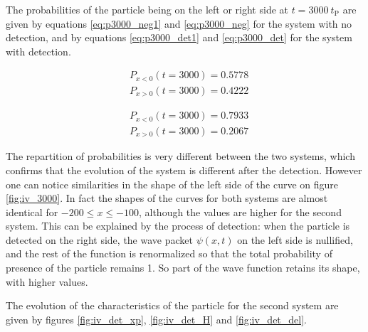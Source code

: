 \documentclass[a4paper,12pt,twoside]{article}
\begin{document}
The probabilities of the particle being on the left or right side at $t=3000~t_\text{P}$ are given by equations \eqref{eq:p3000_neg1} and \eqref{eq:p3000_neg} for the system with no detection, and by equations \eqref{eq:p3000_det1} and \eqref{eq:p3000_det} for the system with detection.

\begin{align}
 &P_{x<0}(t=3000)=0.5778
 \label{eq:p3000_neg1}\\
 &P_{x>0}(t=3000)=0.4222
 \label{eq:p3000_neg}
\end{align}

\begin{align}
 &P_{x<0}(t=3000)=0.7933
 \label{eq:p3000_det1}\\
 &P_{x>0}(t=3000)=0.2067
 \label{eq:p3000_det}
\end{align}

The repartition of probabilities is very different between the two systems, which confirms that the evolution of the system is different after the detection. However one can notice similarities in the shape of the left side of the curve on figure \ref{fig:iv_3000}. In fact the shapes of the curves for both systems are almost identical for $-200\leq x\leq -100$, although the values are higher for the second system. This can be explained by the process of detection: when the particle is detected on the right side, the wave packet $\psi(x,t)$ on the left side is nullified, and the rest of the function is renormalized so that the total probability of presence of the particle remains 1. So part of the wave function retains its shape, with higher values.

The evolution of the characteristics of the particle for the second system are given by figures \ref{fig:iv_det_xp}, \ref{fig:iv_det_H} and \ref{fig:iv_det_del}.
\end{document}
